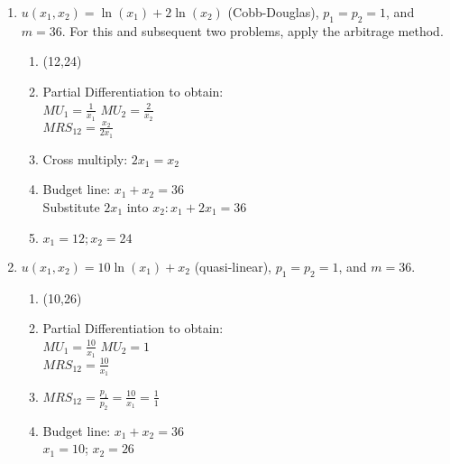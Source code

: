 \documentclass[11pt]{article}
\begin{document}
\begin{enumerate}
\begin{enumerate}
        \item $u(x_{1},x_{2})=\ln(x_{1})+2\ln(x_{2})$ (Cobb-Douglas), $p_{1}=p_{2}=1$, and $m=36$. For this and subsequent two problems, apply the arbitrage method.
        \begin{enumerate}
            \item (12,24)
            \item Partial Differentiation to obtain:\\
            $MU_1 = \frac{1}{x_1}$ $MU_2 = \frac {2}{x_2}$\\
            $MRS_{12} = \frac{x_2}{2x_1}$
            \item Cross multiply: $2x_1=x_2$
            \item Budget line: $x_1+x_2=36$\\
            Substitute $2x_1$ into $x_2: x_1+ 2x_1 =36$
            \item $x_1 =12; x_2 =24$
        \end{enumerate}


        \item $u(x_{1},x_{2})=10\ln(x_{1})+x_{2}$ (quasi-linear), $p_{1}=p_{2}=1$, and $m=36$.
        \begin{enumerate}
            \item (10,26)
            \item Partial Differentiation to obtain:\\
            $MU_1 = \frac{10}{x_1}$ $MU_2 = 1$\\
            $MRS_{12} = \frac{10}{x_1}$
            \item $MRS_{12} = \frac{p_1}{p_2}= \frac{10}{x_1} = \frac{1}{1}$\\
            \item Budget line: $x_1+x_2=36$\\
            $x_1=10$; $x_2=26$
        \end{enumerate}


\end{enumerate}
\end{enumerate}
\end{document}
